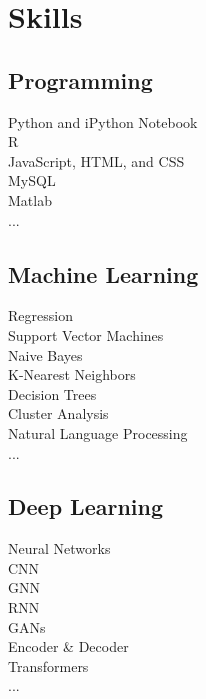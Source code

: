 \documentclass[a4paper]{deedy-resume} %
\begin{document}
\begin{minipage}[t]{0.33\textwidth} %


\section{Skills}

\subsection{Programming}
Python and iPython Notebook \\
R \\
JavaScript, HTML, and CSS \\
MySQL\\
Matlab\\
...\\

\subsection{Machine Learning}
Regression \\
Support Vector Machines \\
Naive Bayes \\
K-Nearest Neighbors \\
Decision Trees \\
Cluster Analysis \\
Natural Language Processing \\
...\\

\sectionspace %

\subsection{Deep Learning}
Neural Networks \\
CNN \\
GNN \\
RNN \\
GANs \\ 
Encoder \& Decoder \\
Transformers\\
...\\

\sectionspace %


\end{minipage}
\end{document}
